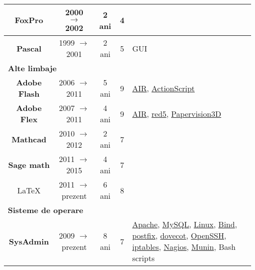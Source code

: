\documentclass[utf8x,helvetica,narrow,romanian,logo,totpages]{europecv}
\begin{document}
\begin{europecv}
{\begin{tabular}{ | c | c | c | c | >{\centering\arraybackslash}p{2.282cm} |}
    \textbf{FoxPro}
        & 2000 $\to$ 2002
        & 2 ani
        & 4
        &
    \\ \hline

    \textbf{Pascal}
        & 1999 $\to$ 2001
        & 2 ani
        & 5
        & GUI
    \\ \hline\hline

    \multicolumn{5}{|l|}{\textbf{Alte limbaje}} \\ \hline

    \textbf{Adobe Flash}
        & 2006 $\to$ 2011
        & 5 ani
        & 9
        & \href{http://www.adobe.com/products/air.html}{AIR}, \href{http://help.adobe.com/livedocs/specs/actionscript/3/wwhelp/wwhimpl/js/html/wwhelp.htm}{ActionScript}
    \\ \hline

    \textbf{Adobe Flex}
        & 2007 $\to$ 2011
        & 4 ani
        & 9
        & \href{http://www.adobe.com/products/air.html}{AIR}, \href{http://www.red5.org/}{red5}, \href{http://blog.papervision3d.org/}{Papervision3D}
    \\ \hline

    \textbf{Mathcad}
        & 2010 $\to$ 2012
        & 2 ani
        & 7
        &
    \\ \hline

    \textbf{Sage math}
        & 2011 $\to$ 2015
        & 4 ani
        & 7
        &
    \\ \hline

    \LaTeX{}
        & 2011 $\to$ prezent
        & 6 ani
        & 8
        &
    \\ \hline \hline

    \multicolumn{5}{|l|}{\textbf{Sisteme de operare}} \\ \hline

    \textbf{\hspace{-0.20cm} SysAdmin \hspace{-0.20cm}}
        & 2009 $\to$ prezent
        & 8 ani
        & 7
        & \footnotesize{\href{http://httpd.apache.org/}{Apache}, \href{http://www.mysql.com/}{MySQL}, \href{https://www.kernel.org/}{Linux}, \href{https://www.isc.org/downloads/bind/}{Bind}, \href{http://www.postfix.org/}{postfix}, \href{http://www.dovecot.org/}{dovecot}, \href{http://www.openssh.com/}{OpenSSH}, \href{http://www.netfilter.org/projects/iptables/index.html}{iptables}, \href{https://www.nagios.org/}{Nagios}, \href{http://munin-monitoring.org/}{Munin}, Bash scripts}
    \\ \hline


\end{tabular}}
\end{europecv}
\end{document}
